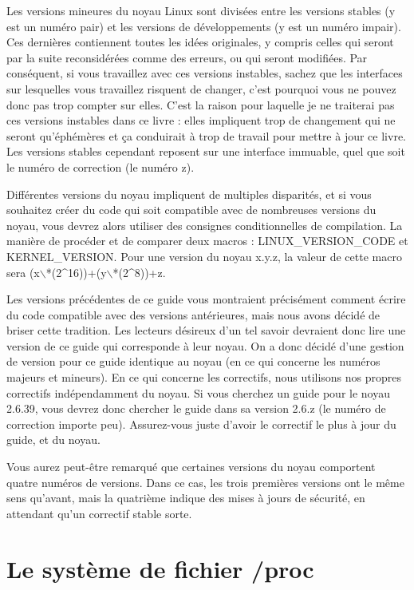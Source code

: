 \documentclass[11pt]{article}
\begin{document}
Les versions mineures du noyau Linux sont divisées entre les versions stables (y est un numéro pair) et les versions de développements (y est un numéro impair). Ces dernières contiennent toutes les idées originales, y compris celles qui seront par la suite reconsidérées comme des erreurs, ou qui seront modifiées. Par conséquent, si vous travaillez avec ces versions instables, sachez que les interfaces sur lesquelles vous travaillez risquent de changer, c'est pourquoi vous ne pouvez donc pas trop compter sur elles. C'est la raison pour laquelle je ne traiterai pas ces versions instables dans ce livre : elles impliquent trop de changement qui ne seront qu'éphémères et ça conduirait à trop de travail pour mettre à jour ce livre. Les versions stables cependant reposent sur une interface immuable, quel que soit le numéro de correction (le numéro z).

Différentes versions du noyau impliquent de multiples disparités, et si vous souhaitez créer du code qui soit compatible avec de nombreuses versions du noyau, vous devrez alors utiliser des consignes conditionnelles de compilation. La manière de procéder et de comparer deux macros : LINUX\_VERSION\_CODE et KERNEL\_VERSION. Pour une version du noyau x.y.z, la valeur de cette macro sera (x$\backslash$*(2\^{}16))+(y$\backslash$*(2\^{}8))+z.

Les versions précédentes de ce guide vous montraient précisément comment écrire du code compatible avec des versions antérieures, mais nous avons décidé de briser cette tradition. Les lecteurs désireux d'un tel savoir devraient donc lire une version de ce guide qui corresponde à leur noyau. On a donc décidé d'une gestion de version pour ce guide identique au noyau (en ce qui concerne les numéros majeurs et mineurs). En ce qui concerne les correctifs, nous utilisons nos propres correctifs indépendamment du noyau. Si vous cherchez un guide pour le noyau 2.6.39, vous devrez donc chercher le guide dans sa version 2.6.z (le numéro de correction importe peu). Assurez-vous juste d'avoir le correctif le plus à jour du guide, et du noyau.

Vous aurez peut-être remarqué que certaines versions du noyau comportent quatre numéros de versions. Dans ce cas, les trois premières versions ont le même sens qu'avant, mais la quatrième indique des mises à jours de sécurité, en attendant qu'un correctif stable sorte.

\section*{Le système de fichier /proc}
\label{sec-7}
\end{document}
